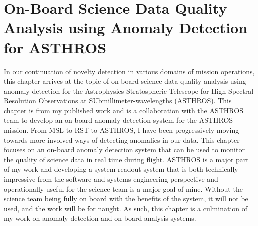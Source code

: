 \chapter[On-Board Science Data Quality Analysis using Anomaly Detection for ASTHROS]{On-Board Science Data Quality Analysis using Anomaly Detection for ASTHROS}
\label{ch:spectra}
In our continuation of novelty detection in various domains of mission operations, this chapter arrives at the topic of on-board science data quality analysis using anomaly detection for the Astrophysics Stratospheric Telescope for High Spectral Resolution Observations at SUbmillimeter-wavelengths (ASTHROS).
This chapter is from my published work \cite{horton2024board} and is a collaboration with the ASTHROS team to develop an on-board anomaly detection system for the ASTHROS mission.
From MSL to RST to ASTHROS, I have been progressively moving towards more involved ways of detecting anomalies in our data.
This chapter focuses on an on-board anomaly detection system that can be used to monitor the quality of science data in real time during flight.
ASTHROS is a major part of my work and developing a system readout system that is both technically impressive from the software and systems engineering perspective and operationally useful for the science team is a major goal of mine.
Without the science team being fully on board with the benefits of the system, it will not be used, and the work will be for naught.
As such, this chapter is a culmination of my work on anomaly detection and on-board analysis systems.

